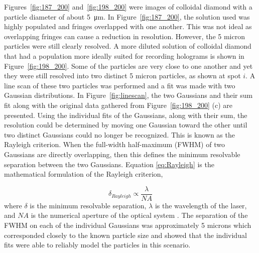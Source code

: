 Figures~\ref{fig:187_200} and~\ref{fig:198_200} were images of colloidal diamond
with a particle diameter of about \SI{5}{\micro\meter}.
In Figure~\ref{fig:187_200}, the
solution used was highly populated and fringes overlapped with one another.
This was not ideal as overlapping fringes can cause a reduction in
resolution. However, the 5 micron particles were still clearly resolved.
A more diluted solution of colloidal diamond that
had a population more ideally suited for recording holograms is shown in Figure~\ref{fig:198_200}.
Some of the
particles are very close to one another and yet they were still resolved
into two distinct 5 micron particles, as shown at spot $i$. 
A line scan of these two particles was performed and a fit was made with two
Gaussian distributions. In Figure~\ref{fig:linescan}, the two
Gaussians and their sum fit along with the original data gathered from Figure~\ref{fig:198_200}
(c) are presented. Using the individual fits of the Gaussians, along with their sum, the resolution could be
determined by moving one Gaussian toward the other until two distinct Gaussians
could no longer be recognized. This is known as the Rayleigh
criterion. 
When the full-width half-maximum (FWHM) of two Gaussians
are directly overlapping, then this defines the minimum resolvable separation
between the two Gaussians. Equation \ref{eq:Rayleigh} is the mathematical
formulation of the Rayleigh criterion,

\begin{equation}
    \delta_{Rayleigh} \propto \frac{\lambda}{NA}
    \label{eq:Rayleigh}
\end{equation}
%
where $\delta$ is the minimum resolvable separation, $\lambda$ is the
wavelength of the laser, and $NA$ is the numerical aperture of the optical
system \cite{Goodman}.
The separation of the FWHM on each of the individual Gaussians was
approximately 5 microns which corresponded closely to the known particle size and
showed that the individual fits were able to reliably model the particles in this
scenario.


